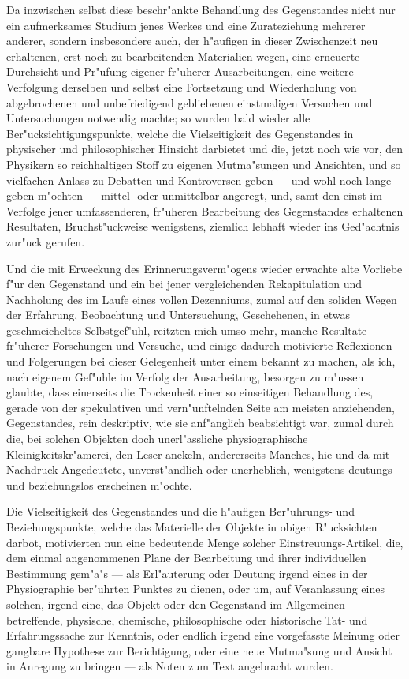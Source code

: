 \documentclass[a4paper, 11pt, oneside, german]{article}
\begin{document}
Da inzwischen selbst diese beschr"ankte Behandlung des Gegenstandes nicht nur ein aufmerksames Studium jenes Werkes und eine Zurateziehung mehrerer anderer, sondern insbesondere auch, der h"aufigen in dieser Zwischenzeit neu erhaltenen, erst noch zu bearbeitenden Materialien wegen, eine erneuerte Durchsicht und Pr"ufung eigener fr"uherer Ausarbeitungen, eine weitere Verfolgung derselben und selbst eine Fortsetzung und Wiederholung von abgebrochenen und unbefriedigend gebliebenen einstmaligen Versuchen und Untersuchungen notwendig machte; so wurden bald wieder alle Ber"ucksichtigungspunkte, welche die Vielseitigkeit des Gegenstandes in physischer und philosophischer Hinsicht darbietet und die, jetzt noch wie vor, den Physikern so reichhaltigen Stoff zu eigenen Mutma"sungen und Ansichten, und so vielfachen Anlass zu Debatten und Kontroversen geben --- und wohl noch lange geben m"ochten --- mittel- oder unmittelbar angeregt, und, samt den einst im Verfolge jener umfassenderen, fr"uheren Bearbeitung des Gegenstandes erhaltenen Resultaten, Bruchst"uckweise wenigstens, ziemlich lebhaft wieder ins Ged"achtnis zur"uck gerufen.

Und die mit Erweckung des Erinnerungsverm"ogens wieder erwachte alte Vorliebe f"ur den Gegenstand und ein bei jener vergleichenden Rekapitulation und Nachholung des im Laufe eines vollen Dezenniums, zumal auf den soliden Wegen der Erfahrung, Beobachtung und Untersuchung, Geschehenen, in etwas geschmeicheltes Selbstgef"uhl, reitzten mich umso mehr, manche Resultate fr"uherer Forschungen und Versuche, und einige dadurch motivierte Reflexionen und Folgerungen bei dieser Gelegenheit unter einem bekannt zu machen, als ich, nach eigenem Gef"uhle im Verfolg der Ausarbeitung, besorgen zu m"ussen glaubte, dass einerseits die Trockenheit einer so einseitigen Behandlung des, gerade von der spekulativen und vern"unftelnden Seite am meisten anziehenden, Gegenstandes, rein deskriptiv, wie sie anf"anglich beabsichtigt war, zumal durch die, bei solchen Objekten doch unerl"assliche physiographische Kleinigkeitskr"amerei, den Leser anekeln, andererseits Manches, hie und da mit Nachdruck Angedeutete, unverst"andlich oder unerheblich, wenigstens deutungs- und beziehungslos erscheinen m"ochte.

Die Vielseitigkeit des Gegenstandes und die h"aufigen Ber"uhrungs- und Beziehungspunkte, welche das Materielle der Objekte in obigen R"ucksichten darbot, motivierten nun eine bedeutende Menge solcher Einstreuungs-Artikel, die, dem einmal angenommenen Plane der Bearbeitung und ihrer individuellen Bestimmung gem"a"s --- als Erl"auterung oder Deutung irgend eines in der Physiographie ber"uhrten Punktes zu dienen, oder um, auf Veranlassung eines solchen, irgend eine, das Objekt oder den Gegenstand im Allgemeinen betreffende, physische, chemische, philosophische oder historische Tat- und Erfahrungssache zur Kenntnis, oder endlich irgend eine vorgefasste Meinung oder gangbare Hypothese zur Berichtigung, oder eine neue Mutma"sung und Ansicht in Anregung zu bringen --- als Noten zum Text angebracht wurden.
\end{document}
